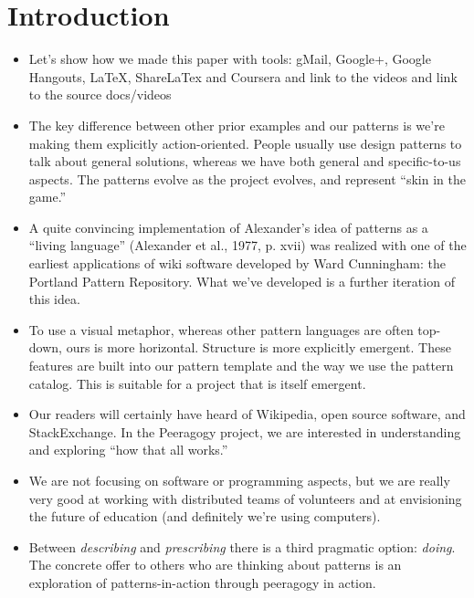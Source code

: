 \section{Introduction}

\begin{itemize}
\item Let's show how we made this paper with tools: gMail, Google+, Google Hangouts, LaTeX, ShareLaTex and Coursera and link to the videos and link to the source docs/videos
\item The key difference between other prior examples and our
patterns is we're making them explicitly action-oriented.  People usually use design patterns to talk about general
solutions, whereas we have both general and specific-to-us aspects.
The patterns evolve as the project evolves, and represent ``skin in the game.''
\item A quite convincing implementation of Alexander’s idea of patterns as a “living language” (Alexander et
al., 1977, p. xvii) was realized with one of the earliest applications of wiki
software developed by Ward Cunningham: the Portland Pattern Repository.
What we've developed is a further iteration of this idea.
\item To use a visual metaphor, whereas other pattern languages are often top-down,
ours is more horizontal.  Structure is more explicitly emergent.  These features are built
into our pattern template and the way we use the pattern catalog.  This is suitable for a project
that is itself emergent.
\item Our readers will certainly have heard of Wikipedia, open source
software, and StackExchange.  In the Peeragogy project, we are interested in
understanding and exploring ``how that all works.''
\item We are not focusing on software or programming aspects, but we
are really very good at working with distributed teams of volunteers and
at envisioning the future of education (and definitely we're using
computers).
\item Between \emph{describing} and \emph{prescribing} there is a third pragmatic option: \emph{doing}.
The concrete offer to others who are thinking about patterns is an exploration of patterns-in-action
through peeragogy in action.
\end{itemize}
